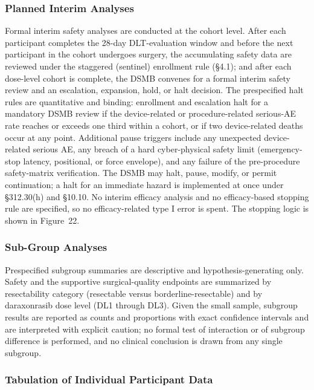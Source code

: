 \subsubsection{Planned Interim Analyses}

Formal interim safety analyses are conducted at the cohort level. After each
participant completes the 28-day DLT-evaluation window and before the next
participant in the cohort undergoes surgery, the accumulating safety data are
reviewed under the staggered (sentinel) enrollment rule (\S4.1); and after each
dose-level cohort is complete, the DSMB convenes for a formal interim safety
review and an escalation, expansion, hold, or halt decision. The prespecified
halt rules are quantitative and binding: enrollment and escalation halt for a
mandatory DSMB review if the device-related or procedure-related serious-AE rate
reaches or exceeds one third within a cohort, or if two device-related deaths
occur at any point. Additional pause triggers include any unexpected
device-related serious AE, any breach of a hard cyber-physical safety limit
(emergency-stop latency, positional, or force envelope), and any failure of the
pre-procedure safety-matrix verification. The DSMB may halt, pause, modify, or
permit continuation; a halt for an immediate hazard is implemented at once under
\S312.30(h) and \S10.10. No interim efficacy analysis and no efficacy-based
stopping rule are specified, so no efficacy-related type I error is spent. The
stopping logic is shown in Figure~22.

\subsubsection{Sub-Group Analyses}

Prespecified subgroup summaries are descriptive and hypothesis-generating only.
Safety and the supportive surgical-quality endpoints are summarized by
resectability category (resectable versus borderline-resectable) and by
daraxonrasib dose level (DL1 through DL3). Given the small sample, subgroup
results are reported as counts and proportions with exact confidence intervals and
are interpreted with explicit caution; no formal test of interaction or of
subgroup difference is performed, and no clinical conclusion is drawn from any
single subgroup.

\subsubsection{Tabulation of Individual Participant Data}

